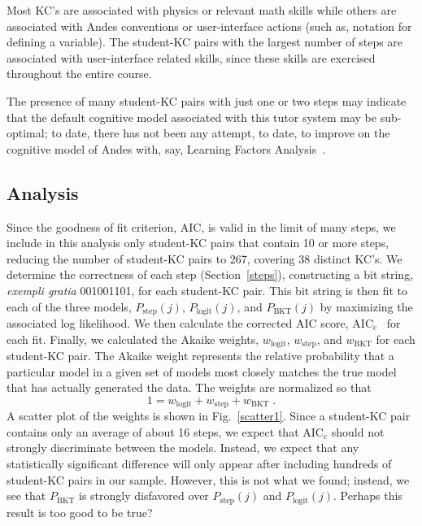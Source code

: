 \documentclass{acmlarge-edm}
\begin{document}
Most KC's are associated with physics
or relevant math skills while others are associated with 
Andes conventions or user-interface actions (such as, notation
for defining a variable).  The student-KC pairs with the largest 
number of steps are associated with user-interface related skills,
since these skills are exercised throughout the entire course. 

The presence of many student-KC pairs with just one or two
steps may indicate that the default cognitive model associated 
with this tutor system may be sub-optimal; to date, there has not 
been any attempt, to date, to improve on the cognitive model of 
Andes with, say, Learning Factors Analysis~\cite{cen_learning_2006}.

\subsection{Analysis}

Since the goodness of fit criterion, AIC, is valid in the limit 
of many steps, we include in this analysis only student-KC 
pairs that contain 10 or more steps, reducing the number of 
student-KC pairs to 267, covering 38 distinct KC's.
We determine the correctness of each step (Section~\ref{steps}),
constructing a bit string, {\em exempli gratia}
001001101, for each student-KC pair.  
This bit string is then fit to each of the three models,
$P_\mathrm{step}(j)$, $P_\mathrm{logit}(j)$, and $P_\mathrm{BKT}(j)$ by
maximizing the associated log likelihood.  
We then calculate the corrected AIC score,
 AIC$_\mathrm{c}$~\cite{burnham_model_2002} for each fit.  
Finally, we calculated the Akaike weights, $w_\mathrm{logit}$,
$w_\mathrm{step}$, and $w_\mathrm{BKT}$ for each student-KC pair.  
The Akaike weight represents the relative probability that
a particular model in a given set of models most closely matches
the true model that has actually generated the data.
The weights are normalized so that 
%
\begin{equation}
   1=w_\mathrm{logit}+ w_\mathrm{step} + w_\mathrm{BKT} \; .
\end{equation}
%
A scatter plot of the weights is shown in Fig.~\ref{scatter1}.
Since a student-KC pair contains only an average of about 16 steps, we 
expect that AIC$_\mathrm{c}$ should not strongly
discriminate between the models.  Instead, we expect that
any statistically significant difference will only appear 
after including hundreds of student-KC pairs in our sample.  However, 
this is not what we found; instead, we see that $P_\mathrm{BKT}$ is 
strongly disfavored over $P_\mathrm{step}(j)$ and $P_\mathrm{logit}(j)$.
Perhaps this result is too good to be true?
\end{document}

